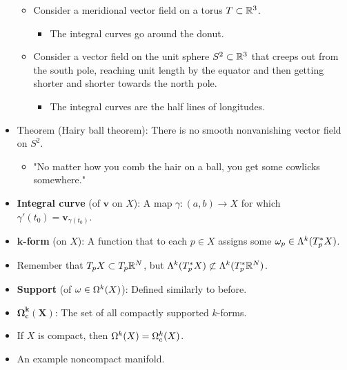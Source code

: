 \documentclass[../notes.tex]{subfiles}
\begin{document}
\begin{itemize}
\begin{itemize}
\begin{itemize}
        \end{itemize}
        \item Consider a meridional vector field on a torus $T\subset\R^3$.
        \begin{itemize}
            \item The integral curves go around the donut.
        \end{itemize}
        \item Consider a vector field on the unit sphere $S^2\subset\R^3$ that creeps out from the south pole, reaching unit length by the equator and then getting shorter and shorter towards the north pole.
        \begin{itemize}
            \item The integral curves are the half lines of longitudes.
        \end{itemize}
    \end{itemize}
    \item Theorem (Hairy ball theorem): There is no smooth nonvanishing vector field on $S^2$.
    \begin{itemize}
        \item "No matter how you comb the hair on a ball, you get some cowlicks somewhere."
    \end{itemize}
    \item \textbf{Integral curve} (of $\bm{v}$ on $X$): A map $\gamma:(a,b)\to X$ for which $\gamma'(t_0)=\bm{v}_{\gamma(t_0)}$.
    \item \textbf{$\bm{k}$-form} (on $X$): A function that to each $p\in X$ assigns some $\omega_p\in\lam[k]{T_p^*X}$.
    \item Remember that $T_pX\subset T_p\R^N$, but $\lam[k]{T_p^*X}\not\subset\lam[k]{T_p^*\R^N}$.
    \item \textbf{Support} (of $\omega\in\ome[k]{X}$): Defined similarly to before.
    \item $\bm{\Omega_c^k(X)}$: The set of all compactly supported $k$-forms.
    \item If $X$ is compact, then $\ome[k]{X}=\Omega_c^k(X)$.
    \item An example noncompact manifold.
    \begin{figure}[H]
        \centering
\end{figure}
\end{itemize}
\end{document}
